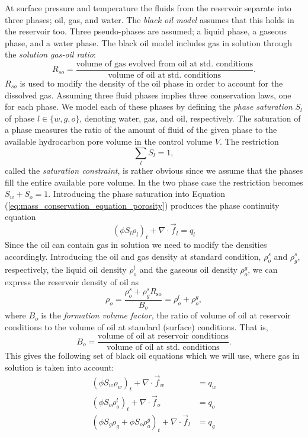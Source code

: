 At surface pressure and temperature the fluids from the reservoir separate into three phases; oil, gas, and water. The \emph{black oil model} assumes that this holds in the reservoir too. Three pseudo-phases are assumed; a liquid phase, a gaseous phase, and a water phase. The black oil model includes gas in solution through the \emph{solution gas-oil ratio}:
\begin{equation*}
R_{so} = \frac{\text{volume of gas evolved from oil at std. conditions}}{\text{volume of oil at std. conditions}}. 
\end{equation*}
$R_{so}$ is used to modify the density of the oil phase in order to account for the dissolved gas. Assuming three fluid phases implies three conservation laws, one for each phase. We model each of these phases by defining the \emph{phase saturation} $S_l$ of phase $l \in \{w,g,o\}$, denoting water, gas, and oil, respectively. The saturation of a phase measures the ratio of the amount of fluid of the given phase to the available hydrocarbon pore volume in the control volume $V$. The restriction 
\begin{equation} \label{eq:saturation_constraint}
\sum_l S_l = 1,
\end{equation} 
called the \emph{saturation constraint}, is rather obvious since we assume that the phases fill the entire available pore volume. In the two phase case the restriction becomes $S_w + S_o = 1$. Introducing the phase saturation into Equation (\ref{eq:mass_conservation_equation_porosity}) produces the phase continuity equation
\begin{equation} \label{eq:continuity_phase}
( \phi S_l \rho_l )_t + \nabla \cdot \vec{f}_l = q_l
\end{equation}
Since the oil can contain gas in solution we need to modify the densities accordingly. Introducing the oil and gas density at standard condition, $\rho_{o}^{s}$ and $\rho_{g}^{s}$, respectively, the liquid oil density $\rho_{o}^{l}$ and the gaseous oil density $\rho_{o}^{g}$, we can express the reservoir density of oil as 
\begin{equation*}
\rho_o = \frac{\rho_o^s+\rho_g^s R_\text{so}}{B_o} = \rho_{o}^{l} + \rho_{o}^{g}, 
\end{equation*}
where $B_o$ is the \emph{formation volume factor}, the ratio of volume of oil at reservoir conditions to the volume of oil at standard (surface) conditions. That is,
\begin{equation*}
B_{o} = \frac{\text{volume of oil at reservoir conditions}}{\text{volume of oil at std. conditions}}. 
\end{equation*}
This gives the following set of black oil equations which we will use, where gas in solution is taken into account:
\begin{subequations}
\label{eq:black_oil_model}
\begin{align}
( \phi S_w \rho_w )_t + \nabla \cdot \vec{f}_w &= q_w \\
( \phi S_o \rho_{o}^{l} )_t + \nabla \cdot \vec{f}_o &= q_o \\
( \phi S_g \rho_g + \phi S_o \rho_{o}^{g} )_t + \nabla \cdot \vec{f}_l &= q_g
\end{align}
\end{subequations}
